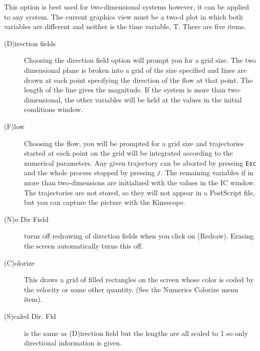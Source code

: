 \documentclass{article}
\newcommand{\tc}[1]{\addcontentsline{toc}{subsection}{#1}}
\begin{document}
\begin{description}
\begin{description}
\end{description}
\tc{Direction Field/Flow}\item[(D)irection Field/Flow]
This option is best used for two-dimensional systems however,
 it can be applied to any system.  The current graphics view must be a
 two-d plot in which both variables are different and neither is the time
 variable, T.  There are five items.
\begin{description}
\item[(D)irection fields] Choosing the direction field option will prompt you for 
a grid size.  The two dimensional plane is broken into a grid of the size
 specified and lines are drawn at each point specifying the direction of 
the flow at that point. The length of the line gives the 
magnitude. If the system is more than two-dimensional, the
 other variables will be held at the values in the initial conditions
window.
\item[(F)low] Choosing the flow, you will be prompted for a grid size
and
 trajectories
 started at each point on the grid will be integrated according to the
 numerical parameters.  Any given trajectory can be aborted by pressing 
{\tt Esc} and the whole process stopped by pressing {\tt /}.  The
remaining
 variables 
if in more than two-dimensions are initialized with the values in the
IC window.  The trajectories are not stored, so they will not appear in a
PostScript file, but you can capture the picture with the Kinescope.
\item[(N)o Dir Field] turns off redrawing of direction fields when you
click on (Redraw).  Erasing the screen automatically turns this off.
\item[(C)olorize] This draws a grid of filled rectangles on the screen
whose color is coded by the velocity or some other quantity. (See the
Numerics Colorize menu item).
\item[(S)caled Dir. Fld] is the same as (D)irection field but the
lengths are all scaled to 1 so only directional information is given.
\end{description}



\end{description}
\end{document}
